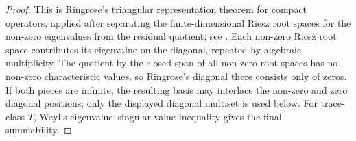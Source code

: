 \begin{proof}
  This is Ringrose's triangular representation theorem for compact operators,
  applied after separating the finite-dimensional Riesz root spaces for the
  non-zero eigenvalues from the residual quotient; see
  \cite[Chapter~1, Theorem~3, pp.~6--8]{Ringrose1971CompactNonSelfAdjoint}.
  Each non-zero Riesz root space contributes its eigenvalue on the diagonal,
  repeated by algebraic multiplicity.  The quotient by the closed span of all
  non-zero root spaces has no non-zero characteristic values, so Ringrose's
  diagonal there consists only of zeros.  If both pieces are infinite, the
  resulting basis may interlace the non-zero and zero diagonal positions; only
  the displayed diagonal multiset is used below.  For trace-class \(T\), Weyl's
  eigenvalue--singular-value inequality gives the final summability.
\end{proof}

